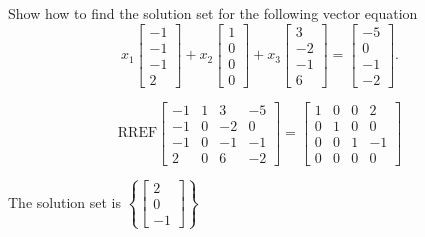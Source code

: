 
\begin{exerciseStatement}


Show how to find the solution set for the following vector equation \[ x_{1} \left[\begin{array}{c}
-1 \\
-1 \\
-1 \\
2
\end{array}\right] + x_{2} \left[\begin{array}{c}
1 \\
0 \\
0 \\
0
\end{array}\right] + x_{3} \left[\begin{array}{c}
3 \\
-2 \\
-1 \\
6
\end{array}\right] = \left[\begin{array}{c}
-5 \\
0 \\
-1 \\
-2
\end{array}\right] .\]


\end{exerciseStatement}
    
\begin{exerciseAnswer} 
\[\mathrm{RREF} \left[\begin{array}{ccc|c}
-1 & 1 & 3 & -5 \\
-1 & 0 & -2 & 0 \\
-1 & 0 & -1 & -1 \\
2 & 0 & 6 & -2
\end{array}\right]  =  \left[\begin{array}{ccc|c}
1 & 0 & 0 & 2 \\
0 & 1 & 0 & 0 \\
0 & 0 & 1 & -1 \\
0 & 0 & 0 & 0
\end{array}\right] \]

The solution set is \( \left\{ \left[\begin{array}{c}
2 \\
0 \\
-1
\end{array}\right] \right\} \)


\end{exerciseAnswer}
    
